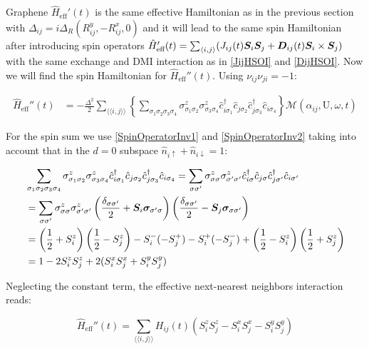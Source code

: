 \begin{section}{Graphene}
$\hat{H}_{\text{eff}}'(t)$ is the same effective Hamiltonian as in the previous section with $\Delta_{ij} = i\Delta_R (R_{ij}^y, - R_{ij}^x, 0)$ and it will lead to the same spin Hamiltonian after introducing spin operators $\hat{H}_{\text{eff}}'(t) = \sum_{\langle i,j \rangle} (J_{ij}(t) \boldsymbol{S}_i\boldsymbol{S}_j + \boldsymbol{D}_{ij}(t)\boldsymbol{S}_i \times \boldsymbol{S}_j)$ with the same exchange and DMI interaction as in \ref{JijHSOI} and \ref{DijHSOI}. Now we will find the spin Hamiltonian for $\hat{H}_{\text{eff}}''(t)$. Using $\nu_{ij}\nu_{ji} = -1$:

\begin{align*}
\hat{H}_{\text{eff}}''(t) &= -\frac{\Delta^2}{2} \sum_{\langle \langle i,j \rangle \rangle} \left\{ \sum_{\sigma_1 \sigma_2 \sigma_3 \sigma_4} \sigma_{\sigma_1 \sigma_2}^z\sigma_{\sigma_3 \sigma_4}^z \hat{c}_{i\sigma_1}^\dagger\hat{c}_{j\sigma_2}\hat{c}_{j\sigma_3}^\dagger\hat{c}_{i\sigma_4} \right\} \mathcal{M}(\alpha_{ij}, \text{U}, \omega, t)
\end{align*}

For the spin sum we use \ref{SpinOperatorInv1} and \ref{SpinOperatorInv2} taking into account that in the $d=0$ subspace $\hat{n}_{i\uparrow}+\hat{n}_{i\downarrow} = 1$:

\begin{align*}
&\sum_{\sigma_1 \sigma_2 \sigma_3 \sigma_4} \sigma_{\sigma_1 \sigma_2}^z\sigma_{\sigma_3 \sigma_4}^z \hat{c}_{i\sigma_1}^\dagger\hat{c}_{j\sigma_2}\hat{c}_{j\sigma_3}^\dagger\hat{c}_{i\sigma_4} = \sum_{\sigma \sigma'} \sigma_{\sigma \sigma}^z\sigma_{\sigma' \sigma'}^z \hat{c}_{i\sigma}^\dagger\hat{c}_{j\sigma}\hat{c}_{j\sigma'}^\dagger\hat{c}_{i\sigma'} \\
&= \sum_{\sigma \sigma'} \sigma_{\sigma \sigma}^z\sigma_{\sigma' \sigma'}^z \left( \frac{\delta_{\sigma\sigma'}}{2} + \boldsymbol{S}_i\boldsymbol{\sigma}_{\sigma'\sigma}\right)\left( \frac{\delta_{\sigma\sigma'}}{2} - \boldsymbol{S}_j\boldsymbol{\sigma}_{\sigma\sigma'}\right) \\
&= \left( \frac{1}{2}+S_i^z \right) \left( \frac{1}{2}-S_j^z \right) - S_i^-(-S_j^+)-S_i^+(-S_j^-) + \left( \frac{1}{2}-S_i^z \right) \left( \frac{1}{2}+S_j^z \right) \\
&= 1-2S_i^zS_j^z+2(S_i^xS_j^x+S_i^yS_j^y)
\end{align*}

Neglecting the constant term, the effective next-nearest neighbors interaction reads:

\begin{equation}
\hat{H}_{\text{eff}}''(t) = \sum_{\langle \langle i,j \rangle \rangle} H_{ij}(t) (S_i^zS_j^z - S_i^xS_j^x - S_i^yS_j^y)
\end{equation}


\end{section}
